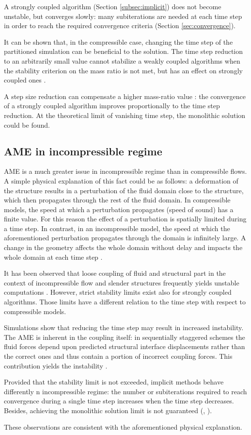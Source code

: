A strongly coupled algorithm (Section \ref{subsec:implicit}) does not become unstable, but converges slowly: many subiterations are needed at each time step in order to reach the required convergence criteria (Section \ref{sec:convergence}).

It can be shown that, in the compressible case, changing the time step of the partitioned simulation can be beneficial to the solution. The time step reduction to an arbitrarily small value cannot stabilize a weakly coupled algorithms when the stability criterion on the mass ratio is not met, but has an effect on strongly coupled ones \cite{van2009added}.  

A step size reduction can compensate a higher mass-ratio value \cite{forster2006artificial}:
the convergence of a strongly coupled algorithm improves proportionally to the time step reduction. At the theoretical limit of vanishing time step, the monolithic solution could be found. 


\subsection{AME in incompressible regime}

AME is a much greater issue in incompressible regime than in compressible flows. A simple physical explanation of this fact could be as follows: a deformation of the structure results in a perturbation of the fluid domain close to the structure, which then propagates through the rest of the fluid domain. In compressible models, the speed at which a perturbation propagates (speed of sound) has a finite value. For this reason the effect of a perturbation is spatially limited during a time step. In contrast, in an incompressible model, the speed at which the aforementioned perturbation propagates through the domain is infinitely large. A change in the geometry affects the whole domain without delay and impacts the whole domain at each time step \cite{causin2005added}.

It has been observed that loose coupling of fluid and structural part in the context of incompressible flow and slender structures frequently yields unstable computations \cite{forster2006artificial}. However, strict stability limits exist also for strongly coupled algorithms. Those limits have a different relation to the time step with respect to compressible models.

Simulations show that reducing the time step may result in increased instability. The AME is inherent in the coupling itself: in sequentially staggered schemes the fluid forces depend upon predicted structural
interface displacements rather than the correct ones and thus contain a portion of incorrect coupling forces. This contribution yields the instability \cite{degroote2008stability}.

Provided that the stability limit is not exceeded, implicit methods behave differently n incompressible regime: the number or subiterations required to reach convergence during a single time step increases when the time step decreases. Besides, achieving the monolithic solution limit is not guaranteed (\cite{forster2006artificial}, \cite{van2009added}).

These observations are consistent with the aforementioned physical explanation.
